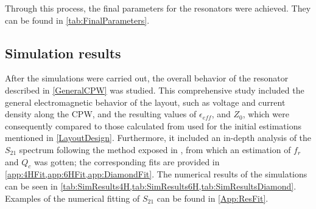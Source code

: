 \documentclass[12pt, a4paper]{article}
\begin{document}
Through this process, the final parameters for the resonators were achieved. They can be found in \cref{tab:FinalParameters}.

\subsection{Simulation results} \label{SimuResultsSection}

\begin{table}[ht]
    \centering
    \caption{Final parameters achieved for resonators with 4H-SiC, 6H-SiC, and Diamond substrates. All parameters were iteratively simulated in order to arrive at the desired conditions.}
    \label{tab:FinalParameters}
\end{table}

After the simulations were carried out, the overall behavior of the resonator described in \cref{GeneralCPW} was studied. This comprehensive study included the general electromagnetic behavior of the layout, such as voltage and current density along the CPW, and the resulting values of $\epsilon_{eff}$, and $Z_0$, which were consequently compared to those calculated from \cite{Wadell1991} used for the initial estimations mentioned in \cref{LayoutDesign}. Furthermore, it included an in-depth analysis of the $S_{21}$ spectrum following the method exposed in \cite{Lopez-Nunez2025}, from which an estimation of $f_r$ and $Q_c$ was gotten; the corresponding fits are provided in \cref{app:4HFit,app:6HFit,app:DiamondFit}. The numerical results of the simulations can be seen in \cref{tab:SimResults4H,tab:SimResults6H,tab:SimResultsDiamond}. Examples of the numerical fitting of $S_{21}$ can be found in \cref{App:ResFit}.
\end{document}
